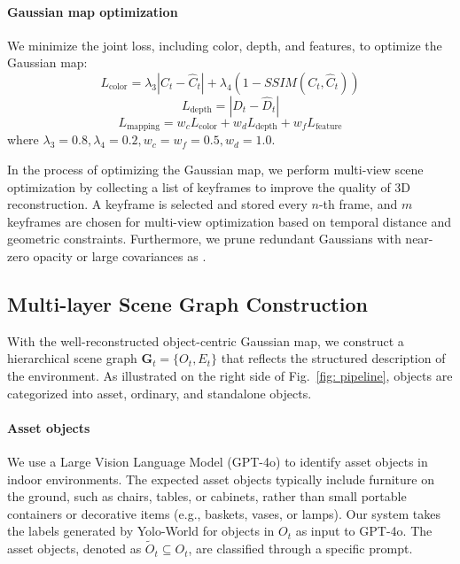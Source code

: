\paragraph{Gaussian map optimization}
\label{para:map_optimization}
We minimize the joint loss, including color, depth, and features, to optimize the Gaussian map:
\begin{equation}
L_\text{color} = \lambda_3|C_t - \hat{C}_t| + \lambda_4(1-SSIM(C_t, \hat{C}_t))
\end{equation}
\begin{equation}
L_\text{depth} = |D_t - \hat{D}_t|
\end{equation}
\begin{equation}
L_\text{mapping} = w_c L_\text{color} + w_d L_\text{depth} + w_f L_\text{feature}
\end{equation}
where $\lambda_3 = 0.8, \lambda_4 = 0.2, w_c = w_f =0.5, w_d = 1.0$.

In the process of optimizing the Gaussian map, we perform multi-view scene optimization by collecting a list of keyframes to improve the quality of 3D reconstruction. A keyframe is selected and stored every $n$-th frame, and $m$ keyframes are chosen for multi-view optimization based on temporal distance and geometric constraints. Furthermore, we prune redundant Gaussians with near-zero opacity or large covariances as \cite{kerbl20233d}.

\subsection{Multi-layer Scene Graph Construction}
\label{subsec:scene_graph_generation}
With the well-reconstructed object-centric Gaussian map, we construct a hierarchical scene graph $\textbf{G}_t =\{O_{t}, E_t\}$ that reflects the structured description of the environment. As illustrated on the right side of Fig.~\ref{fig: pipeline}, objects are categorized into asset, ordinary, and standalone objects.

\paragraph{Asset objects}
\label{para:asset_layer}
We use a Large Vision Language Model (GPT-4o) to identify asset objects in indoor environments. The expected asset objects typically include furniture on the ground, such as chairs, tables, or cabinets, rather than small portable containers or decorative items (e.g., baskets, vases, or lamps). Our system takes the labels generated by Yolo-World\cite{cheng2024yoloworldrealtimeopenvocabularyobject} for objects in $O_t$ as input to GPT-4o. The asset objects, denoted as $ \tilde{O}_t  \subseteq O_t$, are classified through a specific prompt.

